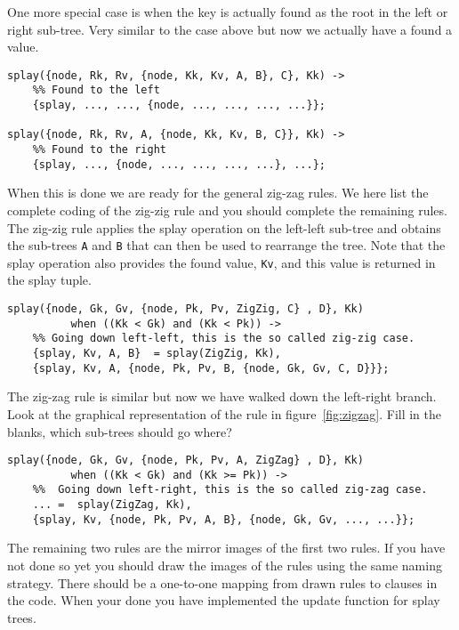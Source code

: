 \documentclass[a4paper,11pt]{article}
\begin{document}
One more special case is when the key is actually found as the root in
the left or right sub-tree. Very similar to the case above but now we
actually have a found a value. 

\begin{lstlisting}
splay({node, Rk, Rv, {node, Kk, Kv, A, B}, C}, Kk) ->
    %% Found to the left 
    {splay, ..., ..., {node, ..., ..., ..., ...}};

splay({node, Rk, Rv, A, {node, Kk, Kv, B, C}}, Kk) ->
    %% Found to the right
    {splay, ..., {node, ..., ..., ..., ...}, ...};
\end{lstlisting}

When this is done we are ready for the general zig-zag rules. We here
list the complete coding of the zig-zig rule and you should complete
the remaining rules. The zig-zig rule applies the splay operation on
the left-left sub-tree and obtains the sub-trees {\tt A} and {\tt B}
that can then be used to rearrange the tree. Note that the splay
operation also provides the found value, {\tt Kv}, and this value is
returned in the splay tuple.

\begin{lstlisting}
splay({node, Gk, Gv, {node, Pk, Pv, ZigZig, C} , D}, Kk) 
          when ((Kk < Gk) and (Kk < Pk)) ->
    %% Going down left-left, this is the so called zig-zig case. 
    {splay, Kv, A, B}  = splay(ZigZig, Kk),
    {splay, Kv, A, {node, Pk, Pv, B, {node, Gk, Gv, C, D}}};
\end{lstlisting}

The zig-zag rule is similar but now we have walked down the left-right
branch. Look at the graphical representation of the rule in
figure~\ref{fig:zigzag}. Fill in the blanks, which sub-trees should go
where?

\begin{lstlisting}  
splay({node, Gk, Gv, {node, Pk, Pv, A, ZigZag} , D}, Kk) 
          when ((Kk < Gk) and (Kk >= Pk)) ->
    %%  Going down left-right, this is the so called zig-zag case. 
    ... =  splay(ZigZag, Kk),
    {splay, Kv, {node, Pk, Pv, A, B}, {node, Gk, Gv, ..., ...}};
\end{lstlisting}

The remaining two rules are the mirror images of the first two
rules. If you have not done so yet you should draw the images of the
rules using the same naming strategy. There should be a one-to-one
mapping from drawn rules to clauses in the code. When your done you
have implemented the update function for splay trees.
\end{document}
